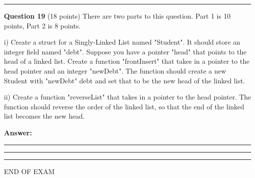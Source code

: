 \documentclass{exam}
\begin{document}
\begin{center}\noindent\rule{6in}{0.4pt}\end{center}

\textbf{Question 19} (18 points) There are two parts to this question. Part 1 is 10 points, Part 2 is 8 points.

i) Create a struct for a Singly-Linked List named "Student". It should store an integer field named "debt". Suppose you have a pointer "head" that points to the head of a linked list. Create a function "frontInsert" that takes in a pointer to the head pointer and an integer "newDebt". The function should create a new Student with "newDebt" debt and set that to be the new head of the linked list.

ii) Create a function "reverseList" that takes in a pointer to the head pointer. The function should reverse the order of the linked list, so that the end of the linked list becomes the new head.

\textbf{Answer:}

\newpage

\begin{center}\noindent\rule{6in}{0.4pt}\end{center}

\newpage

\begin{center}\noindent\rule{6in}{0.4pt}\end{center}

\begin{center}\noindent\rule{6in}{0.4pt}\end{center}

\vspace{5px}

\begin{center} END OF EXAM \end{center}
\end{document}
